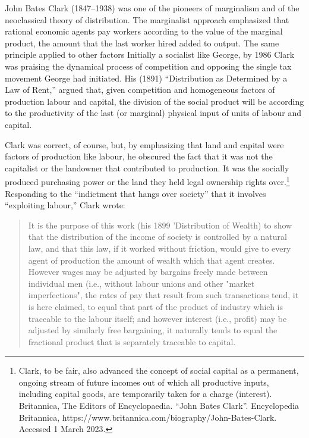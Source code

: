  John Bates Clark (1847--1938) was one of the pioneers of marginalism and of the neoclassical theory of  distribution.  The marginalist approach emphasized that rational economic agents  pay workers according to the value of the marginal product, the amount that the last worker hired added to output. %
 The same principle applied to other factors  
 Initially a socialist like George,   %
 by 1986 Clark was praising the dynamical process of competition and opposing the single tax movement George had initiated.  His (1891) ``Distribution as Determined by a Law of Rent,''\cite{clarkDistributionDeterminedLaw1891} argued that, given  competition and homogeneous factors of production labour and capital, the division of the social product will be according to the productivity of the last (or marginal) physical input of units of labour and capital.

 Clark was correct, of course, but, by emphasizing that land and capital were factors of production like labour, he obscured the fact  that it was not the capitalist or the landowner that contributed  to production. It was the socially produced purchasing power or the land they held legal ownership rights over.\footnote{Clark, to be fair, also advanced the concept of social capital as a permanent, ongoing stream of future incomes out of which all productive inputs, including capital goods, are temporarily taken for a charge (interest). Britannica, The Editors of Encyclopaedia. ``John Bates Clark''. Encyclopedia Britannica, https://www.britannica.com/biography/John-Bates-Clark. Accessed 1 March 2023.}  Responding to the ``indictment that hangs over society'' that it involves ``exploiting labour,'' Clark wrote:
    \begin{quotation}
        It is the purpose of this work (his 1899 'Distribution of Wealth) to show that the distribution of the income of society is controlled by a natural law, and that this law, if it worked without friction, would give to every agent of production the amount of wealth which that agent creates. However wages may be adjusted by bargains freely made between individual men (i.e., without labour unions and other "market imperfections", the rates of pay that result from such transactions tend, it is here claimed, to equal that part of the product of industry which is traceable to the labour itself; and however interest (i.e., profit) may be adjusted by similarly free bargaining, it naturally tends to equal the fractional product that is separately traceable to capital. 
  \end{quotation}
  
